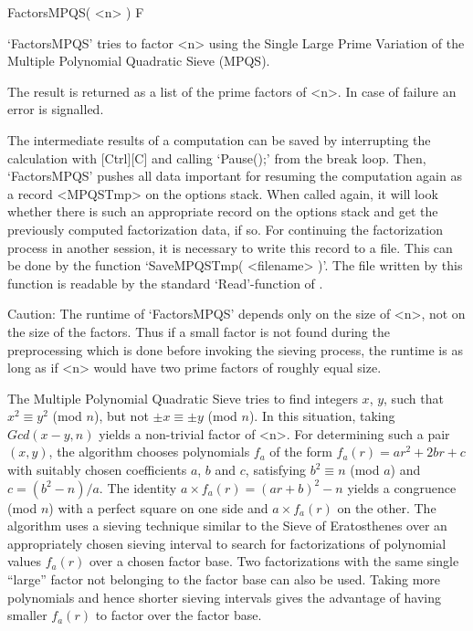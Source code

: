 
\>FactorsMPQS( <n> ) F

`FactorsMPQS' tries to factor <n> using the Single Large Prime
Variation of the Multiple Polynomial Quadratic Sieve (MPQS).

The result is returned as a list of the prime factors of <n>.
In case of failure an error is signalled.

The intermediate results of a computation can be saved by
interrupting the calculation with [Ctrl][C] and calling `Pause();'
from the break loop. Then, `FactorsMPQS' pushes all data important
for resuming the computation again as a record <MPQSTmp>
on the options stack. When called again, it will look whether
there is such an appropriate record on the options stack
and get the previously computed factorization data, if so. 
For continuing the factorization process in another 
session, it is necessary to write this record to a file.
This can be done by the function `SaveMPQSTmp( <filename> )'.
The file written by this function is readable by the 
standard `Read'-function of {\GAP}.

Caution: The runtime of `FactorsMPQS' depends only on the size of <n>, 
not on the size of the factors.
Thus if a small factor is not found during the preprocessing
which is done before invoking the sieving process, the runtime is
as long as if <n> would have two prime factors of roughly equal size.

The Multiple Polynomial Quadratic Sieve
tries to find integers $x$, $y$, such that $x^2 \equiv y^2$ (mod $n$),
but not $\pm x \equiv \pm y$ (mod $n$). In this situation,
taking $Gcd(x - y,n)$ yields a non-trivial factor of <n>.
For determining such a pair $(x,y)$, the algorithm chooses polynomials
$f_a$ of the form $f_a(r) = ar^2 + 2br + c$ with suitably chosen
coefficients $a$, $b$ and $c$, satisfying $b^2 \equiv n$ (mod $a$)
and $c = (b^2 - n)/a$.
The identity $a \times f_a(r) = (ar + b)^2 - n$ yields a congruence
(mod $n$) with a perfect square on one side and $a \times f_a(r)$ on
the other. The algorithm uses a sieving technique similar to the
Sieve of Eratosthenes over an appropriately chosen
sieving interval to search for factorizations of polynomial values 
$f_a(r)$ over a chosen factor base. Two factorizations with the same
single ``large'' factor not belonging to the factor base can also be
used. Taking more polynomials and hence shorter sieving intervals gives
the advantage of having smaller $f_a(r)$ to factor over the factor base.

